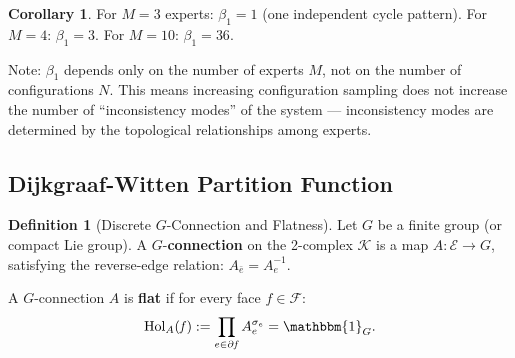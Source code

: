 \documentclass[12pt,a4paper]{article}
\theoremstyle{definition}
\newtheorem{definition}{Definition}[section]
\newtheorem{corollary}{Corollary}[section]
\theoremstyle{remark}
\theoremstyle{definition}
\newcommand{\edgs}{\mathcal{E}}
\newcommand{\faces}{\mathcal{F}}
\newcommand{\face}{\ensuremath{\mathit{f}}}
\newcommand{\Hol}{\mathrm{Hol}}
\newcommand{\ZBetti}{\beta_1}
\begin{document}
\begin{corollary}\label{cor:betti_values}
For $M=3$ experts: $\ZBetti = 1$ (one independent cycle pattern).
For $M=4$: $\ZBetti = 3$. For $M=10$: $\ZBetti = 36$.

Note: $\ZBetti$ depends only on the number of experts $M$, not on the number of configurations $N$.
This means increasing configuration sampling does not increase the number of ``inconsistency modes'' of the system — inconsistency modes are determined by the topological relationships among experts.
\end{corollary}

\subsection{Dijkgraaf-Witten Partition Function}

\begin{definition}[Discrete $G$-Connection and Flatness]\label{def:dw_connection}
Let $G$ be a finite group (or compact Lie group). A $G$-\textbf{connection} on the 2-complex $\mathcal{K}$ is a map $A: \edgs \to G$,
satisfying the reverse-edge relation: $A_{\bar{e}} = A_e^{-1}$.

A $G$-connection $A$ is \textbf{flat} if for every face $\face \in \faces$:
\[
    \Hol_A(\face) := \prod_{e \in \partial \face} A_e^{\sigma_e} = \mathbbm{1}_G.
\]
\end{definition}
\end{document}
